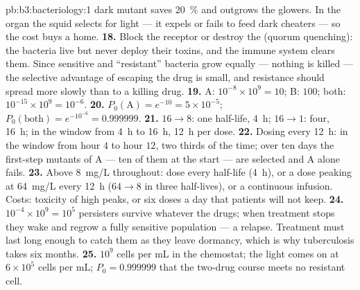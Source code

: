 \begin{solution}{pb:b3:bacteriology:1}
dark mutant saves \qty{20}{\%} and outgrows the glowers. In the organ
the squid selects for light --- it expels or fails to feed dark
cheaters --- so the cost buys a home.
\textbf{18.} Block the receptor or destroy the  (quorum
quenching): the bacteria live but never deploy their toxins, and the
immune system clears them. Since sensitive and ``resistant'' bacteria
grow equally --- nothing is killed --- the selective advantage of
escaping the drug is small, and resistance should spread more slowly
than to a killing drug.
\textbf{19.} A: $10^{-8}\times 10^{9} = 10$; B: $100$; both: $10^{-15}\times
10^{9} = 10^{-6}$.
\textbf{20.} $P_{0}(\text{A}) = e^{-10} = 5\times 10^{-5}$;
$P_{0}(\text{both}) = e^{-10^{-6}} = 0.999999$.
\textbf{21.} $16 \to 8$: one half-life, \qty{4}{h}; $16 \to 1$: four,
\qty{16}{h}; in the window from \qty{4}{h} to \qty{16}{h}, \qty{12}{h}
per dose.
\textbf{22.} Dosing every \qty{12}{h}: in the window from hour $4$ to
hour $12$, two thirds of the time; over ten days the first-step
mutants of A --- ten of them at the start --- are selected and A alone
fails.
\textbf{23.} Above \qty{8}{mg/L} throughout: dose every half-life
(\qty{4}{h}), or a dose peaking at \qty{64}{mg/L} every \qty{12}{h}
($64 \to 8$ in three half-lives), or a continuous infusion. Costs:
toxicity of high peaks, or six doses a day that patients will not
keep.
\textbf{24.} $10^{-4}\times 10^{9} = 10^{5}$ persisters survive whatever
the drugs; when treatment stops they wake and regrow a fully sensitive
population --- a relapse. Treatment must last long enough to catch
them as they leave dormancy, which is why tuberculosis takes six months.
\textbf{25.} $10^{9}$ cells per mL in the chemostat; the light comes on at
$6\times 10^{5}$ cells per mL; $P_{0} = 0.999999$ that the two-drug
course meets no resistant cell.
\end{solution}
